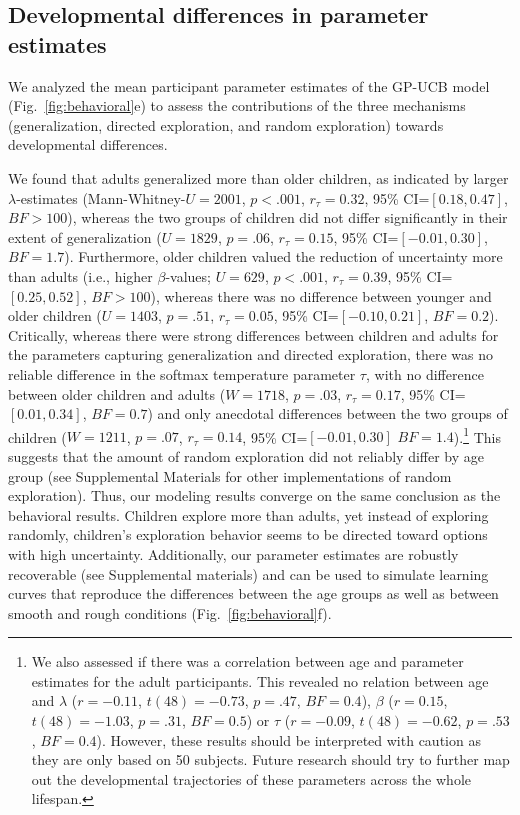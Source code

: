 \documentclass[a4paper,man, floatsintext, natbib]{apa6}
\begin{document}
\subsection{Developmental differences in parameter estimates} 
We analyzed the mean participant parameter estimates of the GP-UCB model (Fig.~\ref{fig:behavioral}e) to assess the contributions of the three mechanisms (generalization, directed exploration, and random exploration) towards developmental differences. 

We found that adults generalized more than older children, as indicated by larger $\lambda$-estimates (Mann-Whitney-$U=2001$, $p<.001$, $r_\tau=0.32$, 95\% CI=$[0.18, 0.47]$, $BF>100$), whereas the two groups of children did not differ significantly in their extent of generalization ($U=1829$, $p=.06$, $r_\tau=0.15$, 95\% CI=$[-0.01, 0.30]$, $BF=1.7$). Furthermore, older children valued the reduction of uncertainty more than adults (i.e., higher $\beta$-values; $U=629$, $p<.001$, $r_\tau=0.39$, 95\% CI=$[0.25, 0.52]$, $BF>100$), whereas there was no difference between younger and older children ($U=1403$, $p=.51$, $r_\tau=0.05$, 95\% CI=$[-0.10, 0.21]$, $BF=0.2$). Critically, whereas there were strong differences between children and adults for the parameters capturing generalization and directed exploration, there was no reliable difference in the softmax temperature parameter $\tau$, with no difference between older children and adults ($W = 1718$, $p=.03$, $r_\tau=0.17$, 95\% CI=$[0.01, 0.34]$, $BF=0.7$) and only anecdotal differences between the two groups of children ($W = 1211$, $p=.07$, $r_\tau=0.14$, 95\% CI=$[-0.01, 0.30]$ $BF=1.4$).\footnote{We also assessed if there was a correlation between age and parameter estimates for the adult participants. This revealed no relation between age and $\lambda$ ($r=-0.11$, $t(48)=-0.73$, $p=.47$, $BF=0.4$), $\beta$ ($r=0.15$, $t(48)=-1.03$, $p=.31$, $BF=0.5$) or $\tau$ ($r=-0.09$, $t(48)=-0.62$, $p=.53$, $BF=0.4$). However, these results should be interpreted with caution as they are only based on 50 subjects. Future research should try to further map out the developmental trajectories of these parameters across the whole lifespan.} This suggests that the amount of random exploration did not reliably differ by age group (see Supplemental Materials for other implementations of random exploration). 
Thus, our modeling results converge on the same conclusion as the behavioral results. Children explore more than adults, yet instead of exploring randomly, children's exploration behavior seems to be directed toward options with high uncertainty. Additionally, our parameter estimates are robustly recoverable (see Supplemental materials) and can be used to simulate learning curves that reproduce the differences between the age groups as well as between smooth and rough conditions (Fig.~\ref{fig:behavioral}f).
\end{document}
